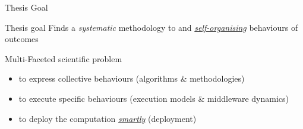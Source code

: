 \documentclass[presentation, 9pt,169]{beamer}\mode<presentation>{\usetheme{AMSBolognaFC}}
\begin{document}
\begin{frame}{Thesis Goal}
  \begin{alertblock}{Thesis goal}
    Finds a \emph{systematic} methodology to  and  \emph{\underline{self-organising}} behaviours of  outcomes
  \end{alertblock}
  \begin{exampleblock}{Multi-Faceted scientific problem}
    \begin{itemize}
      \item {} to express collective behaviours (algorithms \& methodologies)
      \item {} to execute specific behaviours (execution models \& middleware dynamics)
      \item {} to deploy the computation \emph{\underline{smartly}} (deployment)      
    \end{itemize}
  \end{exampleblock}
\end{frame}
\end{document}
